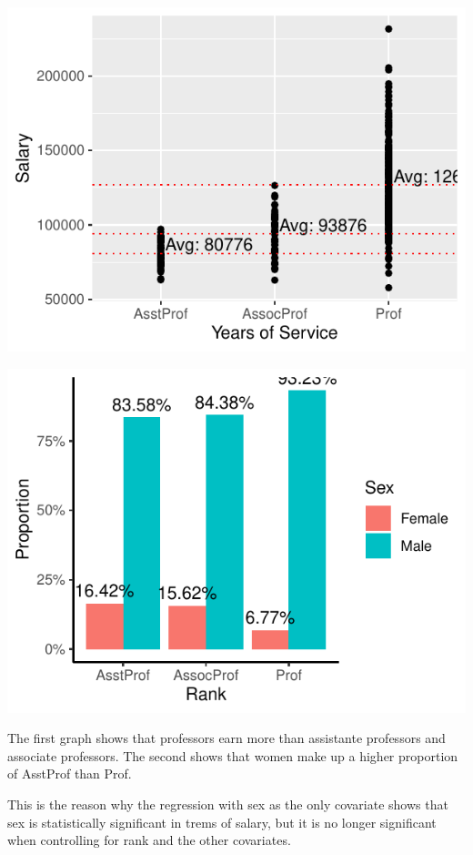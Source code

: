 \documentclass[
]{article}
\begin{document}
\begin{center}\includegraphics{Exercise1_files/figure-latex/unnamed-chunk-7-1} \end{center}

\begin{center}\includegraphics{Exercise1_files/figure-latex/unnamed-chunk-7-2} \end{center}

The first graph shows that professors earn more than assistante
professors and associate professors. The second shows that women make up
a higher proportion of AsstProf than Prof.

This is the reason why the regression with sex as the only covariate
shows that sex is statistically significant in trems of salary, but it
is no longer significant when controlling for rank and the other
covariates.
\end{document}
